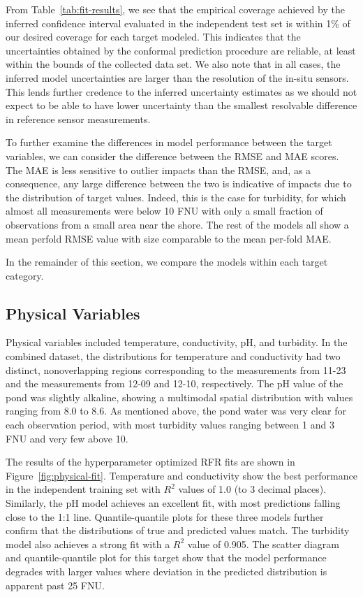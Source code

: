 \documentclass[remotesensing,article,submit,pdftex,moreauthors]{Definitions/mdpi}
\begin{document}
From Table~\ref{tab:fit-results},  we see that the empirical coverage achieved by the inferred confidence interval evaluated in the independent test set is within 1\% of our desired coverage for each target modeled. This indicates that the uncertainties obtained by the conformal prediction procedure are reliable, at least within the bounds of the collected data set. We also note that in all cases, the inferred model uncertainties are larger than the resolution of the in-situ sensors. This lends further credence to the inferred uncertainty estimates as we should not expect to be able to have lower uncertainty than the smallest resolvable difference in reference sensor measurements.

To further examine the differences in model performance between the target variables, we can consider the difference between the RMSE and MAE scores. The MAE is less sensitive to outlier impacts than the RMSE, and, as a consequence, any large difference between the two is indicative of impacts due to the distribution of target values. Indeed, this is the case for turbidity, for which almost all measurements were below 10 FNU with only a small fraction of observations from a small area near the shore. The rest of the models all show a mean perfold RMSE value with size comparable to the mean per-fold MAE. 

In the remainder of this section, we compare the models within each target category.

\subsection{Physical Variables}

Physical variables included temperature, conductivity, pH, and turbidity. In the combined dataset, the distributions for temperature and conductivity had two distinct, nonoverlapping regions corresponding to the measurements from 11-23 and the measurements from 12-09 and 12-10, respectively. The pH value of the pond was slightly alkaline, showing a multimodal spatial distribution with values ranging from 8.0 to 8.6. As mentioned above, the pond water was very clear for each observation period, with most turbidity values ranging between 1 and 3 FNU and very few above 10.

The results of the hyperparameter optimized RFR fits are shown in Figure~\ref{fig:physical-fit}. Temperature and conductivity show the best performance in the independent training set with $R^2$ values of 1.0 (to 3 decimal places). Similarly, the pH model achieves an excellent fit, with most predictions falling close to the 1:1 line. Quantile-quantile plots for these three models further confirm that the distributions of true and predicted values match. The turbidity model also achieves a strong fit with a $R^2$ value of 0.905. The scatter diagram and quantile-quantile plot for this target show that the model performance degrades with larger values where deviation in the predicted distribution is apparent past 25 FNU.
\end{document}
